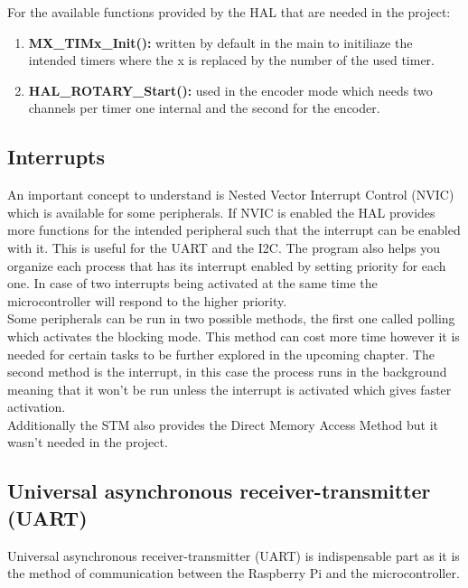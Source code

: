 \clearpage

For the available functions provided by the HAL that are needed in the project:
\begin{enumerate}
    \item \textbf{MX\_TIMx\_Init():} written by default in the main to initiliaze the intended timers where the x is replaced by the number of the used timer.
    \item \textbf{HAL\_ROTARY\_Start():} used in the encoder mode which needs two channels per timer one internal and the second for the encoder.
\end{enumerate}

\subsection{Interrupts}

An important concept to understand is Nested Vector Interrupt Control (NVIC) which is available for some peripherals. If NVIC is enabled the HAL provides more functions for the intended peripheral such that the interrupt can be enabled with it. This is useful for the UART and the I2C.
The program also helps you organize each process that has its interrupt enabled by setting priority for each one. In case of two interrupts being activated at the same time the microcontroller will respond to the higher priority.\\
Some peripherals can be run in two possible methods, the first one called polling which activates the blocking mode. This method can cost more time however it is needed for certain tasks to be further explored in the upcoming chapter. The second method is the interrupt, in this case the process runs in the background meaning that it won’t be run unless the interrupt is activated which gives faster activation.\\
Additionally the STM also provides the Direct Memory Access Method but it wasn’t needed in the project.\\


\subsection{Universal asynchronous receiver-transmitter (UART)}

Universal asynchronous receiver-transmitter (UART) is indispensable part as it is the method of communication between the Raspberry Pi and the microcontroller.

